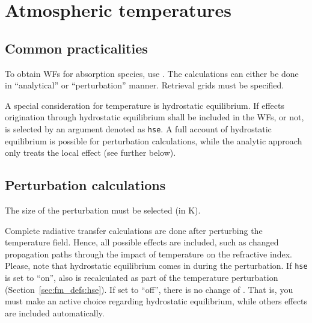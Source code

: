 \section{Atmospheric temperatures}
\label{sec:wfuns:atmtemp}

\subsection{Common practicalities}
%
To obtain WFs for absorption species, use .
The calculations can either be done in ``analytical'' or ``perturbation''
manner. Retrieval grids must be specified.

A special consideration for temperature is hydrostatic equilibrium. If effects
origination through hydrostatic equilibrium shall be included in the WFs, or
not, is selected by an argument denoted as \verb|hse|. A full account of
hydrostatic equilibrium is possible for perturbation calculations, while the
analytic approach only treats the local effect (see further below).


\subsection{Perturbation calculations}
%
The size of the perturbation must be selected (in K).

Complete radiative transfer calculations are done after perturbing the
temperature field. Hence, all possible effects are included, such as changed
propagation paths through the impact of temperature on the refractive index.
Please, note that hydrostatic equilibrium comes in during the perturbation. If
\verb|hse| is set to ``on'', also  is recalculated as part
of the temperature perturbation (Section~\ref{sec:fm_defs:hse}). If set to
``off'', there is no change of . That is, you must make an
active choice regarding hydrostatic equilibrium, while others effects are
included automatically.


